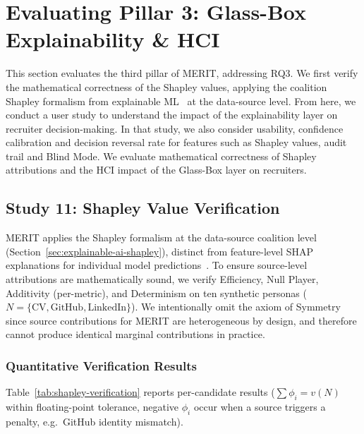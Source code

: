 \section{Evaluating Pillar 3: Glass-Box Explainability \& HCI}
\label{sec:evaluating-explainability}

This section evaluates the third pillar of MERIT, addressing RQ3. We first verify the mathematical correctness of the Shapley values,
applying the coalition Shapley formalism from explainable ML~\cite{lundberg2017unified} at the data-source level.
From here, we conduct a user study to understand the impact of the explainability layer on recruiter decision-making. In that study, we also
consider usability, confidence calibration and decision reversal rate for features such as Shapley values, audit trail and Blind Mode.
We evaluate mathematical correctness of Shapley attributions and the HCI impact of the Glass-Box layer on recruiters.

\subsection{Study 11: Shapley Value Verification}
\label{subsec:study-11-shapley-verification}

MERIT applies the Shapley formalism at the data-source coalition level 
(Section~\ref{sec:explainable-ai-shapley}), distinct from feature-level SHAP 
explanations for individual model predictions~\cite{lundberg2017unified}.
To ensure source-level attributions are mathematically sound, we verify Efficiency, Null Player, Additivity (per-metric), and Determinism 
on ten synthetic personas ($N = \{\text{CV}, \text{GitHub}, \text{LinkedIn}\}$). We intentionally omit the axiom of Symmetry since source
contributions for MERIT are heterogeneous by design, and therefore cannot produce identical marginal contributions in practice.

\subsubsection{Quantitative Verification Results}
Table~\ref{tab:shapley-verification} reports per-candidate results 
($\sum \phi_i = v(N)$ within floating-point tolerance, negative $\phi_i$ occur when a source triggers a penalty, 
e.g.\ GitHub identity mismatch).

